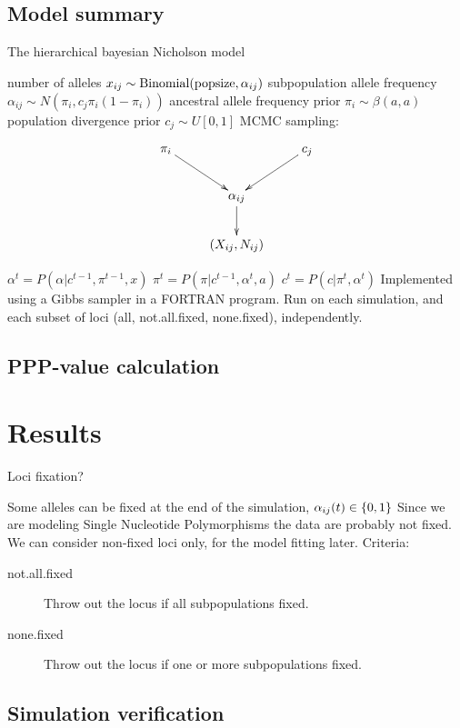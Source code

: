 \documentclass[a4paper,12pt]{article}
\begin{document}
\subsection{Model summary}
{The hierarchical bayesian Nicholson model}{
 number of alleles $x_{ij}\sim \operatorname{Binomial}(\text{popsize},\alpha_{ij})$
 subpopulation allele frequency $\alpha_{ij}\sim N(\pi_i, c_j \pi_i(1-\pi_i))$
 ancestral allele frequency prior $\pi_i\sim \beta(a,a)$
 population divergence prior $c_j\sim U[0,1]$
 MCMC sampling: 

$$
\xymatrix{
  \pi_i \ar[rd] & & c_j \ar[ld] \\
  & \alpha_{ij} \ar[d] & \\
  & (X_{ij},N_{ij})
}
$$


 $\alpha^t = P(\alpha|c^{t-1},\pi^{t-1},x)$
 $\pi^t = P(\pi|c^{t-1},\alpha^t,a)$
 $c^t = P(c|\pi^t,\alpha^t)$
 Implemented using a Gibbs sampler in a FORTRAN program.
 Run on each simulation, and each subset of loci (all,
  not.all.fixed, none.fixed), independently.
}

\subsection{PPP-value calculation}

\section{Results}


Loci fixation?

 Some alleles can be fixed at the end of the simulation,
  $\alpha_{ij}(t)\in\{0,1\}$
 Since we are modeling Single Nucleotide Polymorphisms the data
  are probably not fixed.
 We can consider non-fixed loci only, for the model fitting
  later.
 Criteria:
\begin{description}
\item[not.all.fixed] Throw out the locus if all subpopulations fixed.
\item[none.fixed] Throw out the locus if one or more subpopulations fixed.
\end{description}


\subsection{Simulation verification}

\end{document}
